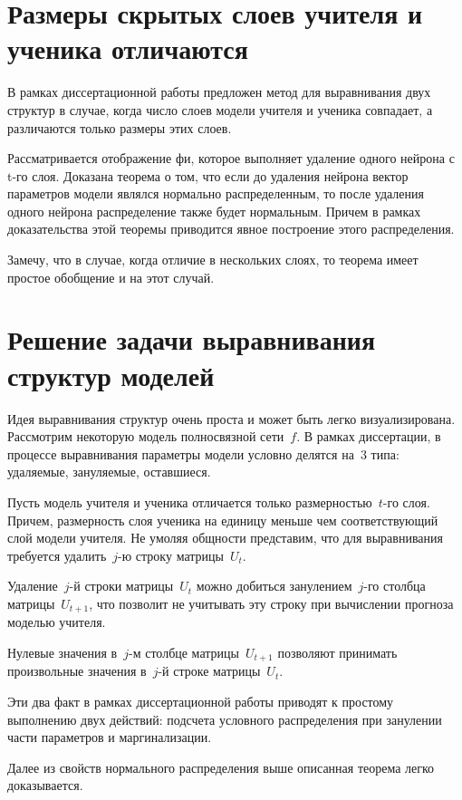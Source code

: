 \documentclass[10pt, twoside]{article}
\begin{document}
\section{Размеры скрытых слоев учителя и ученика отличаются}
В рамках диссертационной работы предложен метод для выравнивания двух структур в случае, когда число слоев модели учителя и ученика совпадает, а различаются только размеры этих слоев.

Рассматривается отображение фи, которое выполняет удаление одного нейрона с t-го слоя.
Доказана теорема о том, что если до удаления нейрона вектор параметров модели являлся нормально распределенным, то после удаления одного нейрона распределение также будет нормальным. Причем в рамках доказательства этой теоремы приводится явное построение этого распределения.

Замечу, что в случае, когда отличие в нескольких слоях, то теорема имеет простое обобщение и на этот случай.

\section{Решение задачи выравнивания структур моделей}

Идея выравнивания структур очень проста и может быть легко визуализирована. Рассмотрим некоторую модель полносвязной сети~$f$. В рамках диссертации, в процессе выравнивания параметры модели условно делятся на~$3$ типа: удаляемые, зануляемые, оставшиеся.

Пусть модель учителя и ученика отличается только размерностью~$t$-го слоя. Причем, размерность слоя ученика на единицу меньше чем соответствующий слой модели учителя. Не умоляя общности представим, что для выравнивания требуется удалить~$j$-ю строку матрицы~$U_t$.

Удаление~$j$-й строки матрицы~$U_t$ можно добиться занулением~$j$-го столбца матрицы~$U_{t+1}$, что позволит не учитывать эту строку при вычислении прогноза моделью учителя.

Нулевые значения в~$j$-м столбце матрицы~$U_{t+1}$ позволяют принимать произвольные значения в~$j$-й строке матрицы~$U_{t}$.

Эти два факт в рамках диссертационной работы приводят к простому выполнению двух действий: подсчета условного распределения при занулении части параметров и маргинализации.

Далее из свойств нормального распределения выше описанная теорема легко доказывается.
\end{document}
